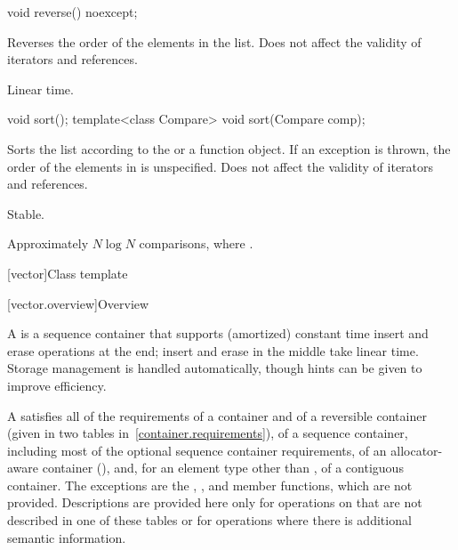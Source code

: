 %
\begin{itemdecl}
void reverse() noexcept;
\end{itemdecl}

\begin{itemdescr}
\pnum
\effects
Reverses the order of the elements in the list.
Does not affect the validity of iterators and references.

\pnum
\complexity
Linear time.
\end{itemdescr}

%
\begin{itemdecl}
void sort();
template<class Compare> void sort(Compare comp);
\end{itemdecl}

\begin{itemdescr}
\pnum
\effects
Sorts the list according to the  or a  function object.
If an exception is thrown,
the order of the elements in  is unspecified.
Does not affect the validity of iterators and references.

\pnum
\remarks Stable.

\pnum
\complexity
Approximately
$N \log N$
comparisons, where
.
\end{itemdescr}

[vector]{Class template }

[vector.overview]{Overview}

\pnum
{}%
A
is a sequence container that supports
(amortized) constant time insert and erase operations at the end;
insert and erase in the middle take linear time.
Storage management is handled automatically, though hints can be given
to improve efficiency.

\pnum
A  satisfies all of the requirements of a container and of a
reversible container (given in two tables in~\ref{container.requirements}), of a
sequence container, including most of the optional sequence container
requirements, of an allocator-aware container
(),
and, for an element type other than ,
of a contiguous container.
The exceptions are the
, , and  member functions, which are not
provided. Descriptions are provided here only for operations on 
that are not described in one of these tables or for operations where there is
additional semantic information.

